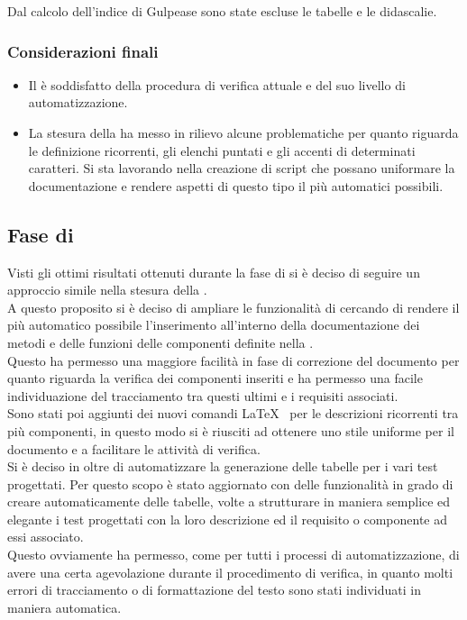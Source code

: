 \FloatBarrier
Dal calcolo dell'indice di Gulpease sono state escluse le tabelle e le didascalie.
\subsubsection{Considerazioni finali}
\begin{itemize}
\item Il  è soddisfatto della procedura di verifica attuale e del suo livello di automatizzazione.
\item La stesura della \ST ha messo in rilievo alcune problematiche per quanto riguarda le definizione ricorrenti, gli elenchi puntati e gli accenti di determinati caratteri. Si sta lavorando nella creazione di script che possano uniformare la documentazione e rendere aspetti di questo tipo il più automatici possibili.
\end{itemize}
\subsection{Fase di \fPDt}
Visti gli ottimi risultati ottenuti durante la fase di \fPA si è deciso di seguire un approccio simile nella stesura della .\\
A questo proposito si è deciso di ampliare le funzionalità di \pragmadb cercando di rendere il più automatico possibile l'inserimento all'interno della documentazione dei metodi e delle funzioni delle componenti definite nella \fPA.\\
Questo ha permesso una maggiore facilità in fase di correzione del documento per quanto riguarda la verifica dei componenti inseriti e ha permesso una facile individuazione del tracciamento tra questi ultimi e i requisiti associati.\\
Sono stati poi aggiunti dei nuovi comandi \LaTeX~ per le descrizioni ricorrenti tra più componenti, in questo modo si è riusciti ad ottenere uno stile uniforme per il documento e a facilitare le attività di verifica.\\
Si è deciso in oltre di automatizzare la generazione delle tabelle per i vari test progettati. Per questo scopo \pragmadb è stato aggiornato con delle funzionalità in grado di creare automaticamente delle tabelle, volte a strutturare in maniera semplice ed elegante i test progettati con la loro descrizione ed il requisito o componente ad essi associato.\\
Questo ovviamente ha permesso, come per tutti i processi di automatizzazione, di avere una certa agevolazione durante il procedimento di verifica, in quanto molti errori di tracciamento o di formattazione del testo sono stati individuati in maniera automatica.
